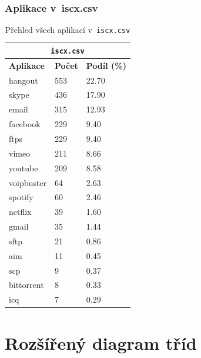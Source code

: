 \subsection{Aplikace v~iscx.csv}
\begin{table}[h!]
	\centering
	\begin{tabular}{lll}
		\toprule
		\multicolumn{3}{c}{\texttt{iscx.csv}} \\
		\midrule
		\textbf{Aplikace} & \textbf{Počet} & \textbf{Podíl (\%)} \\
		\midrule
		hangout           & 553             & 22.70                \\
		skype             & 436             & 17.90                \\
		email             & 315             & 12.93                \\
		facebook          & 229             & 9.40                 \\
		ftps              & 229             & 9.40                 \\
		vimeo             & 211             & 8.66                 \\
		youtube           & 209             & 8.58                 \\
		voipbuster        & 64              & 2.63                 \\
		spotify           & 60              & 2.46                 \\
		netflix           & 39              & 1.60                 \\
		gmail             & 35              & 1.44                 \\
		sftp              & 21              & 0.86                 \\
		aim               & 11              & 0.45                 \\
		scp               & 9               & 0.37                 \\
		bittorrent        & 8               & 0.33                 \\
		icq               & 7               & 0.29                 \\
		\bottomrule
	\end{tabular}
	\caption{Přehled všech aplikací v~\texttt{iscx.csv}}
	\label{tab:iscx-apps-appendix}
\end{table}

\chapter{Rozšířený diagram tříd} 
\label{chp:appendix-class-diagram}

